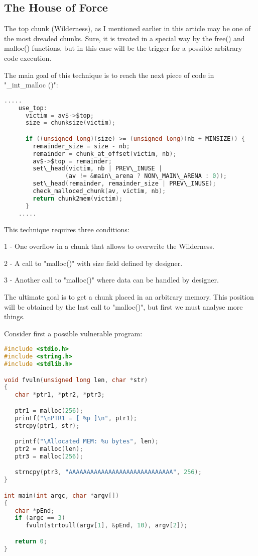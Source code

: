 \documentclass[12pt]{article}
\begin{document}
\subsection{The House of Force}

The top chunk (Wilderness), as I mentioned earlier in this article may be
one of the most dreaded chunks. Sure, it is treated in a special way by
the free() and malloc() functions, but in this case will be the trigger
for a possible arbitrary code execution.
\newline


The main goal of this technique is to reach the next piece of code in
"\_int\_malloc ()":


\begin{lstlisting}[language=C]
    .....
    use_top:
      victim = av$->$top;
      size = chunksize(victim);

      if ((unsigned long)(size) >= (unsigned long)(nb + MINSIZE)) {
        remainder_size = size - nb;
        remainder = chunk_at_offset(victim, nb);
        av$->$top = remainder;
        set\_head(victim, nb | PREV\_INUSE |
                 (av != &main\_arena ? NON\_MAIN\_ARENA : 0));
        set\_head(remainder, remainder_size | PREV\_INUSE);
        check_malloced_chunk(av, victim, nb);
        return chunk2mem(victim);
      }
    .....
\end{lstlisting}


	
This technique requires three conditions:
\newline


    1 - One overflow in a chunk that allows to overwrite the Wilderness.
\newline


    2 - A call to "malloc()" with size field defined by designer.
\newline


    3 - Another call to "malloc()" where data can be handled by designer.
\newline


The ultimate goal is to get a chunk placed in an arbitrary memory. This
position will be obtained by the last call to "malloc()", but first we
must analyse more things.
\newline


Consider first a possible vulnerable program:


\begin{lstlisting}[language=C]
#include <stdio.h>
#include <string.h>
#include <stdlib.h>

void fvuln(unsigned long len, char *str)
{
   char *ptr1, *ptr2, *ptr3;

   ptr1 = malloc(256);
   printf("\nPTR1 = [ %p ]\n", ptr1);
   strcpy(ptr1, str);

   printf("\Allocated MEM: %u bytes", len);
   ptr2 = malloc(len);
   ptr3 = malloc(256);

   strncpy(ptr3, "AAAAAAAAAAAAAAAAAAAAAAAAAAAAA", 256);
}

int main(int argc, char *argv[])
{
   char *pEnd;
   if (argc == 3)
      fvuln(strtoull(argv[1], &pEnd, 10), argv[2]);

   return 0;
}
\end{lstlisting}
\end{document}
